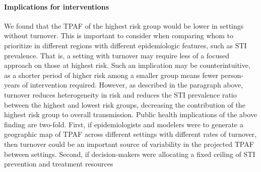 \paragraph{Implications for interventions}
We found that the TPAF of the highest risk group
would be lower in settings without turnover.
This is important to consider when comparing whom to prioritize in different regions
with different epidemiologic features, such as STI prevalence.
That is, a setting with turnover may require less of a focused approach on those at highest risk.
Such an implication may be counterintuitive,
as a shorter period of higher risk among a smaller group means
fewer person-years of intervention required.
However, as described in the paragraph above,
turnover reduces heterogeneity in risk and
reduces the STI prevalence ratio between the highest and lowest risk groups,
decreasing the contribution of the highest risk group to overall transmission.
Public health implications of the above finding are two-fold.
First, if epidemiologists and modelers were to generate
a geographic map of TPAF across different settings with different rates of turnover,
then turnover could be an important source of variability in
the projected TPAF between settings.
Second, if decision-makers were allocating
a fixed ceiling of STI prevention and treatment resources
